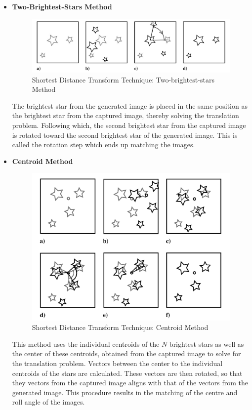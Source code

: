 \begin{itemize}
    \item \textbf{Two-Brightest-Stars Method}
    
    \begin{figure}[h!]
        \centering
        \includegraphics[scale=0.35]{Figures/GNC/shortest_dist_2_brightest.PNG}
        \caption{Shortest Distance Transform Technique: Two-brightest-stars Method}
    \end{figure}
    
    The brightest star from the generated image is placed in the same position as the brightest star from the captured image, thereby solving the translation problem. 
    Following which, the second brightest star from the captured image is rotated toward the second brightest star of the generated image. This is called the rotation step which ends up matching the images.
    
    \item \textbf{Centroid Method}
    
    \begin{figure}[h!]
        \centering
        \includegraphics[scale=0.35]{Figures/GNC/shortest_dist_centroid.PNG}
        \caption{Shortest Distance Transform Technique: Centroid Method}
    \end{figure}
    
    This method uses the individual centroids of the $N$ brightest stars as well as the center of these centroids, obtained from the captured image to solve for the translation problem. 
    Vectors between the center to the individual centroids of the stars are calculated. These vectors are then rotated, so that they vectors from the captured image aligns with that of the vectors from the generated image. This procedure results in the matching of the centre and roll angle of the images.
\end{itemize}

